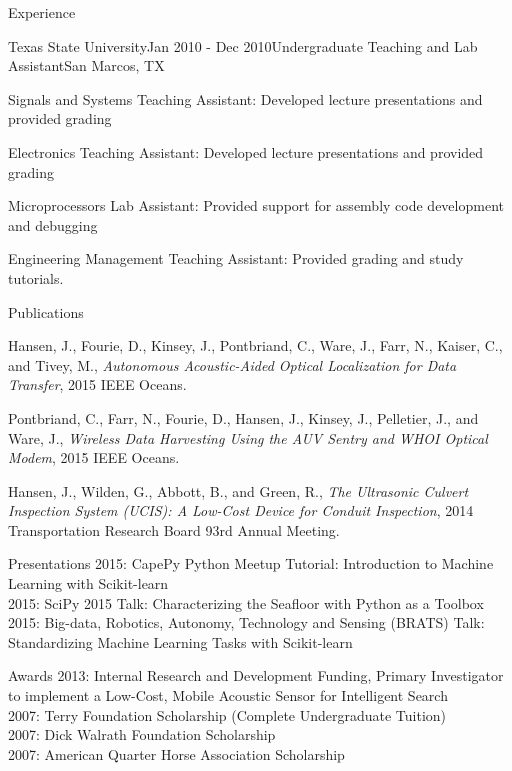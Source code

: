 \documentclass{resume} %
\begin{document}
\begin{rSection}{Experience}
\begin{rSubsection}{Texas State University}{Jan 2010 - Dec 2010}{Undergraduate Teaching and Lab Assistant}{San Marcos, TX}
\item{Signals and Systems Teaching Assistant: Developed lecture presentations and provided grading}
\item{Electronics Teaching Assistant: Developed lecture presentations and provided grading}
\item{Microprocessors Lab Assistant: Provided support for assembly code development and debugging}
\item{Engineering Management Teaching Assistant: Provided grading and study tutorials.}
\end{rSubsection}
\end{rSection}


\begin{rSection}{Publications}

Hansen, J., Fourie, D., Kinsey, J., Pontbriand, C., Ware, J., Farr, N., Kaiser, C., and Tivey, M., \textit{Autonomous Acoustic-Aided Optical Localization for Data Transfer}, 2015 IEEE Oceans.

Pontbriand, C., Farr, N., Fourie, D., Hansen, J.,  Kinsey, J., Pelletier, J., and Ware, J., 
 \textit{Wireless Data Harvesting Using the AUV Sentry and WHOI Optical Modem}, 2015 IEEE Oceans.

Hansen, J., Wilden, G., Abbott, B., and Green, R., \textit{The Ultrasonic Culvert
Inspection System (UCIS): A Low-Cost Device for Conduit Inspection}, 2014 Transportation
Research Board 93rd Annual Meeting. 
\end{rSection}

\begin{rSection}{Presentations}
2015: CapePy Python Meetup Tutorial: Introduction to Machine Learning with Scikit-learn \smallskip \\
2015: SciPy 2015 Talk: Characterizing the Seafloor with Python as a Toolbox \smallskip \\
2015: Big-data, Robotics, Autonomy, Technology and Sensing (BRATS) Talk: Standardizing Machine Learning Tasks with Scikit-learn \\
\end{rSection}

\begin{rSection}{Awards}
{2013: Internal Research and Development Funding, Primary Investigator to implement a Low-Cost, Mobile Acoustic Sensor for Intelligent Search} \smallskip   \\
{2007: Terry Foundation Scholarship (Complete Undergraduate Tuition)}  \smallskip \\
{2007: Dick Walrath Foundation Scholarship} \smallskip \\
{2007: American Quarter Horse Association Scholarship} \smallskip \\
\end{rSection}
\end{document}
